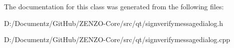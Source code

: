 The documentation for this class was generated from the following files\+:\begin{DoxyCompactItemize}
\item 
D\+:/\+Documentz/\+Git\+Hub/\+Z\+E\+N\+Z\+O-\/\+Core/src/qt/signverifymessagedialog.\+h\item 
D\+:/\+Documentz/\+Git\+Hub/\+Z\+E\+N\+Z\+O-\/\+Core/src/qt/signverifymessagedialog.\+cpp\end{DoxyCompactItemize}
